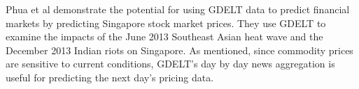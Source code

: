 Phua et al demonstrate the potential for using GDELT data to predict financial markets by predicting Singapore stock market prices. They use GDELT  to examine the impacts of the June 2013 Southeast Asian heat wave and the December 2013 Indian riots on Singapore\cite{phua2014visual}. As mentioned, since commodity prices are sensitive to current conditions, GDELT's day by day news aggregation is useful for predicting the next day's pricing data.